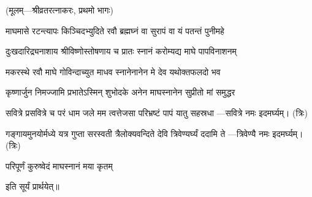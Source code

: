 
\centerline{\small{(मूलम्—श्रीव्रतरत्नाकरः, प्रथमो भागः)}}


\twolineshloka
{माघमासे रटन्त्यापः किञ्चिदभ्युदिते रवौ}
{ब्रह्मघ्नं वा सुरापं वा यं पतन्तं पुनीमहे}

\twolineshloka
{दुःखदारिद्र्यनाशाय श्रीविष्णोस्तोषणाय च}
{प्रातः स्नानं करोम्यद्य माघे पापविनाशनम्}

\twolineshloka
{मकरस्थे रवौ माघे गोविन्दाच्युत माधव}
{स्नानेनानेन मे देव यथोक्तफलदो भव}

\twolineshloka
{कृष्णार्जुन निमज्जामि प्रभातेऽस्मिन् शुभोदके}
{अनेन माघस्नानेन सुप्रीतो मां समुद्धर}


\twolineshloka
{सवित्रे प्रसवित्रे च परं धाम जले मम}
{त्वत्तेजसा परिभ्रष्टं पापं यातु सहस्रधा}
\nobreak\hfill{}—सवित्रे नमः इदमर्घ्यम्। (त्रिः)


\twolineshloka
{गङ्गायमुनयोर्मध्ये यत्र गुप्ता सरस्वती}
{त्रैलोक्यवन्दिते देवि त्रिवेण्यर्घ्यं ददामि ते}
\nobreak\hfill{}—त्रिवेण्यै नमः इदमर्घ्यम्। (त्रिः)


{परिपूर्णं कुरुष्वेदं माघस्नानं मया कृतम्}

इति सूर्यं प्रार्थयेत्॥

\closesection
